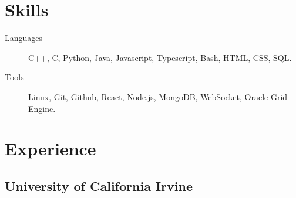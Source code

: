 \documentclass[letterpaper,10pt,oneside]{article}
\begin{document}
\section*{Skills}

\begin{description}
\item[Languages]\quad C++, C, Python, Java, Javascript, Typescript, Bash, HTML, CSS, SQL.
\item[Tools]\quad Linux, Git, Github, React, Node.js, MongoDB, WebSocket, Oracle Grid Engine.
\end{description}
\vspace{-7px}
\section*{Experience}
\subsection*{University of California Irvine}
\vspace{-3px}
\end{document}
